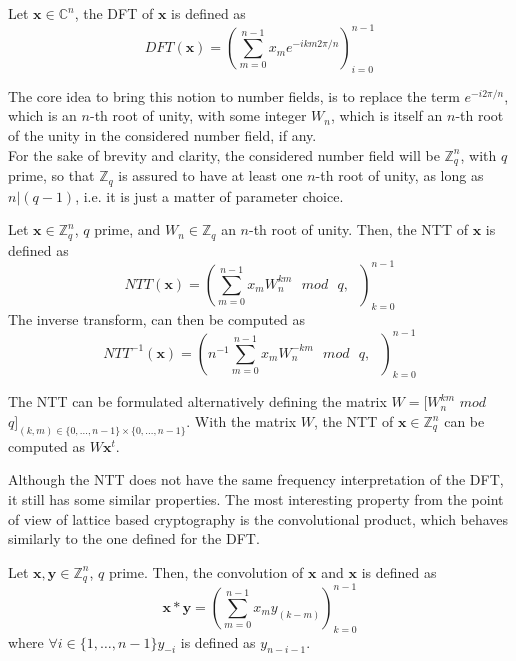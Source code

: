 \begin{definition}
Let $\mathbf{x}\in\mathbb{C}^n$, the DFT of $\mathbf{x}$ is defined as
\begin{equation*}
DFT(\mathbf{x})=\left(\sum_{m=0}^{n-1}x_me^{-ikm2\pi/n} \right)_{i=0}^{n-1}
\end{equation*}
\end{definition}

The core idea to bring this notion to number fields, is to replace the term $e^{-i2\pi/n}$, which is an $n$-th root of unity, with some integer $W_n$, which is itself an $n$-th root of the unity in the considered number field, if any.\\
For the sake of brevity and clarity, the considered number field will be $\mathbb{Z}_q^n$, with $q$ prime, so that $\mathbb{Z}_q$ is assured to have at least one $n$-th root of unity, as long as $n|(q-1)$, i.e. it is just a matter of parameter choice.

\begin{definition}[NTT]
Let $\mathbf{x}\in\mathbb{Z}_q^n$, $q$ prime, and $W_n\in\mathbb{Z}_q$ an $n$-th root of unity. Then, the NTT of $\mathbf{x}$ is defined as
\begin{equation*}
NTT(\mathbf{x})=\left(\sum_{m=0}^{n-1}x_mW_n^{km}\text{ }mod\text{ }q,\text{ }\right)_{k=0}^{n-1}  
\end{equation*}
The inverse transform, can then be computed as
\begin{equation*}
NTT^{-1}(\mathbf{x})=\left(n^{-1}\sum_{m=0}^{n-1}x_mW_n^{-km}\text{ }mod\text{ }q,\text{ }\right)_{k=0}^{n-1}
\end{equation*} 
\end{definition}

\begin{remark}
The NTT can be formulated alternatively defining the matrix $W=[W_n^{km}$ $mod$ $q]_{(k,m)\in\{0,\ldots,n-1\}\times\{0,\ldots,n-1\}}$. With the matrix $W$, the NTT of $\mathbf{x}\in\mathbb{Z}_q^n$ can be computed as $W\mathbf{x}^t$.
\end{remark}

Although the NTT does not have the same frequency interpretation of the DFT, it still has some similar properties. The most interesting property from the point of view of lattice based cryptography is the convolutional product, which behaves similarly to the one defined for the DFT.

\begin{definition}
Let $\mathbf{x},\mathbf{y}\in\mathbb{Z}_q^n$, $q$ prime. Then, the convolution of $\mathbf{x}$ and $\mathbf{x}$ is defined as
\begin{equation*}
\mathbf{x}\ast\mathbf{y} = \left(\sum_{m=0}^{n-1}x_{m}y_{(k-m)}\right)_{k=0}^{n-1}
\end{equation*}
where $\forall i \in \{1,\ldots,n-1\} y_{-i}$ is defined as $y_{n-i-1}$. 
\end{definition}

